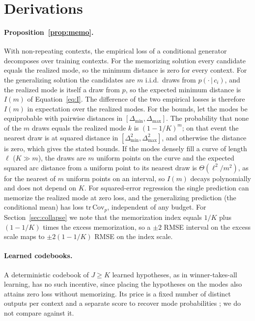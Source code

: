 \section{Derivations}
\label{app:proofs}

\paragraph{Proposition~\ref{prop:memo}.}
With non-repeating contexts, the empirical loss of a conditional generator decomposes over training contexts. For the memorizing solution every candidate equals the realized mode, so the minimum distance is zero for every context. For the generalizing solution the candidates are $m$ i.i.d.\ draws from $p(\cdot\,|\,c_i)$, and the realized mode is itself a draw from $p$, so the expected minimum distance is $I(m)$ of Equation~\ref{eq:I}. The difference of the two empirical losses is therefore $I(m)$ in expectation over the realized modes. For the bounds, let the modes be equiprobable with pairwise distances in $[\Delta_{\min}, \Delta_{\max}]$. The probability that none of the $m$ draws equals the realized mode $k$ is $(1 - 1/K)^m$; on that event the nearest draw is at squared distance in $[\Delta_{\min}^2, \Delta_{\max}^2]$, and otherwise the distance is zero, which gives the stated bounds. If the modes densely fill a curve of length $\ell$ ($K \gg m$), the draws are $m$ uniform points on the curve and the expected squared arc distance from a uniform point to its nearest draw is $\Theta(\ell^2/m^2)$, as for the nearest of $m$ uniform points on an interval, so $I(m)$ decays polynomially and does not depend on $K$. For squared-error regression the single prediction can memorize the realized mode at zero loss, and the generalizing prediction (the conditional mean) has loss $\mathrm{tr}\,\mathrm{Cov}_p$, independent of any budget. For Section~\ref{sec:collapse} we note that the memorization index equals $1/K$ plus $(1 - 1/K)$ times the excess memorization, so a $\pm 2$ RMSE interval on the excess scale maps to $\pm 2(1 - 1/K)$ RMSE on the index scale.

\paragraph{Learned codebooks.} A deterministic codebook of $J \ge K$ learned hypotheses, as in winner-takes-all learning, has no such incentive, since placing the hypotheses on the modes also attains zero loss without memorizing. Its price is a fixed number of distinct outputs per context and a separate score to recover mode probabilities \citep{rupprecht2017mhp,letzelter2024wta}; we do not compare against it.

